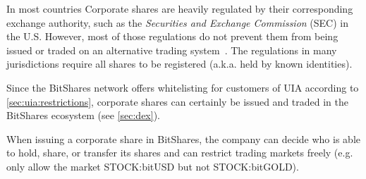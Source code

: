 In most countries Corporate shares are heavily regulated by their corresponding
exchange authority, such as the \emph{Securities and Exchange Commission} (SEC)
in the U.S. However, most of those regulations do not prevent them from being
issued or traded on an alternative trading system~\cite{altTrade}. The
regulations in many jurisdictions require all shares to be registered (a.k.a.
held by known identities). 

Since the BitShares network offers whitelisting for customers of UIA according
to \cref{sec:uia:restrictions}, corporate shares can certainly be issued and
traded in the BitShares ecosystem (see \cref{sec:dex}).

When issuing a corporate share in BitShares, the company can decide who is able
to hold, share, or transfer its shares and can restrict trading markets freely
(e.g. only allow the market STOCK:bitUSD but not STOCK:bitGOLD).

